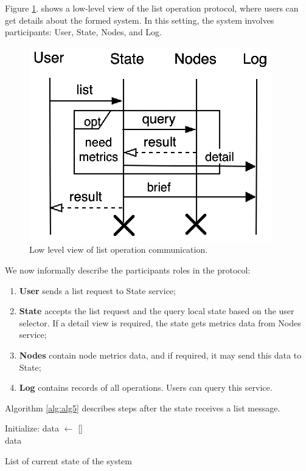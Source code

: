 Figure \ref{fig:fig8}. shows a low-level view of the list operation protocol, where users can get details about the formed system. In this setting, the system involves participants: User, State, Nodes, and Log. 

\begin{figure}[!htbp]
	\begin{center}
		\includegraphics[scale=0.9]{images/FIG4}
	\end{center}
	\vspace{-1.2cm}
	\caption{Low level view of list operation communication.}
	\label{fig:fig8}
\end{figure}

We now informally describe the participants roles in the protocol:\label{list_protocol_informal_description}

\begin{enumerate}[start=1,label={(\bfseries \arabic*)}]
	\item \textbf{User} sends a list request to State service;
	\item \textbf{State} accepts the list request and the query local state based on the user selector. If a detail view is required, the state gets metrics data from Nodes service;
	\item \textbf{Nodes} contain node metrics data, and if required, it may send this data to State;
	\item \textbf{Log} contains records of all operations. Users can query this service.
\end{enumerate}

Algorithm \ref{alg:alg5} describes steps after the state receives a list message.

\begin{algorithm}[H]
	\SetAlgoLined
	Initialize: data $\leftarrow$ []\\
	\Return data
	\caption{List of current state of the system}
	\label{alg:alg5}
\end{algorithm}


